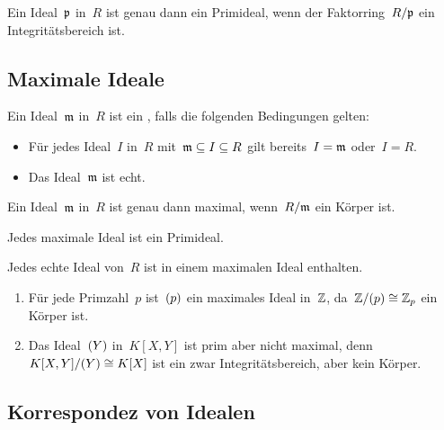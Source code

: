 \begin{proposition}
  Ein Ideal~$\mathfrak{p}$ in~$R$ ist genau dann ein Primideal, wenn der Faktorring~$R/\mathfrak{p}$ ein Integritätsbereich ist.
\end{proposition}



\subsection{Maximale Ideale}

\begin{definition}
  Ein Ideal~$\mathfrak{m}$ in~$R$ ist ein , falls die folgenden Bedingungen gelten:
  \begin{itemize}
    \item
     Für jedes Ideal~$I$ in~$R$ mit~$\mathfrak{m} \subseteq I \subseteq R$ gilt bereits~$I = \mathfrak{m}$ oder~$I = R$.
    \item
      Das Ideal~$\mathfrak{m}$ ist echt.
  \end{itemize}
\end{definition}

\begin{proposition}
  Ein Ideal~$\mathfrak{m}$ in~$R$ ist genau dann maximal, wenn~$R/\mathfrak{m}$ ein Körper ist.
\end{proposition}

\begin{corollary}
  Jedes maximale Ideal ist ein Primideal.
\end{corollary}

\begin{proposition}
  Jedes echte Ideal von~$R$ ist in einem maximalen Ideal enthalten.
\end{proposition}

\begin{example}
  \leavevmode
  \begin{enumerate}
    \item
      Für jede Primzahl~$p$ ist~$(p)$ ein maximales Ideal in~$\mathbb{Z}$, da~$\mathbb{Z}/(p) \cong \mathbb{Z}_p$ ein Körper ist.
    \item
      Das Ideal~$(Y)$ in~$K[X,Y]$ ist prim aber nicht maximal, denn~$K[X,Y] / (Y) \cong K[X]$ ist ein zwar Integritätsbereich, aber kein Körper.
  \end{enumerate}
\end{example}


\subsection{Korrespondez von Idealen}


